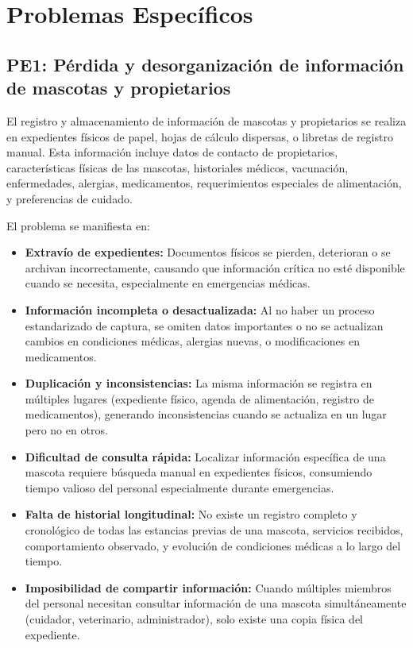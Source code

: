 \section{Problemas Específicos}
\label{sec:problemasEspecificos}

\subsection{PE1: Pérdida y desorganización de información de mascotas y propietarios}
\label{sec:pe1}

	El registro y almacenamiento de información de mascotas y propietarios se realiza en expedientes físicos de papel, hojas de cálculo dispersas, o libretas de registro manual. Esta información incluye datos de contacto de propietarios, características físicas de las mascotas, historiales médicos, vacunación, enfermedades, alergias, medicamentos, requerimientos especiales de alimentación, y preferencias de cuidado.
	
	El problema se manifiesta en:
	
	\begin{itemize}
		\item \textbf{Extravío de expedientes:} Documentos físicos se pierden, deterioran o se archivan incorrectamente, causando que información crítica no esté disponible cuando se necesita, especialmente en emergencias médicas.
		
		\item \textbf{Información incompleta o desactualizada:} Al no haber un proceso estandarizado de captura, se omiten datos importantes o no se actualizan cambios en condiciones médicas, alergias nuevas, o modificaciones en medicamentos.
		
		\item \textbf{Duplicación y inconsistencias:} La misma información se registra en múltiples lugares (expediente físico, agenda de alimentación, registro de medicamentos), generando inconsistencias cuando se actualiza en un lugar pero no en otros.
		
		\item \textbf{Dificultad de consulta rápida:} Localizar información específica de una mascota requiere búsqueda manual en expedientes físicos, consumiendo tiempo valioso del personal especialmente durante emergencias.
		
		\item \textbf{Falta de historial longitudinal:} No existe un registro completo y cronológico de todas las estancias previas de una mascota, servicios recibidos, comportamiento observado, y evolución de condiciones médicas a lo largo del tiempo.
		
		\item \textbf{Imposibilidad de compartir información:} Cuando múltiples miembros del personal necesitan consultar información de una mascota simultáneamente (cuidador, veterinario, administrador), solo existe una copia física del expediente.
	\end{itemize}

